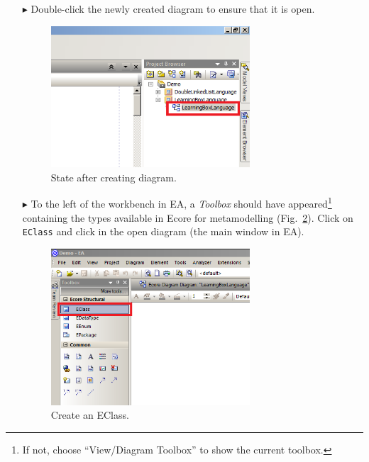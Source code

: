 \begin{enumerate}
\item[$\blacktriangleright$] Double-click the newly created diagram to ensure that it is open.

\begin{figure}[htbp]
	\centering
  \includegraphics[width=0.7\textwidth]{pics/memBoxBilder/memBox06.png}
	\caption{State after creating diagram.}
	\label{fig:diagram_completed}
\end{figure}

\item[$\blacktriangleright$] To the left of the workbench in EA, a \emph{Toolbox} should have appeared\footnote{If not, choose ``View/Diagram Toolbox'' to show the current toolbox.} containing the types available in Ecore for metamodelling (Fig.~\ref{fig:eclass}).
Click on \texttt{EClass} and click in the open diagram (the main window in EA).

\begin{figure}[htbp]
	\centering
  \includegraphics[width=0.7\textwidth]{pics/memBoxBilder/memBox07.png}
	\caption{Create an EClass.}
	\label{fig:eclass}
\end{figure}



\end{enumerate}
